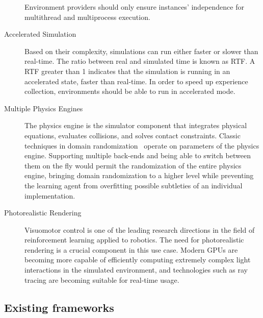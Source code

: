 \begin{description}
Environment providers should only ensure instances' independence for multithread and multiprocess execution.
%
\item[Accelerated Simulation]
%
Based on their complexity, simulations can run either faster or slower than real-time.
The ratio between real and simulated time is known as \ac{RTF}.
A \ac{RTF} greater than 1 indicates that the simulation is running in an accelerated state, \ie faster than real-time.
In order to speed up experience collection, environments should be able to run in accelerated mode.
%
\item[Multiple Physics Engines]
%
The physics engine is the simulator component that integrates physical equations, evaluates collisions, and solves contact constraints.
Classic techniques in domain randomization~\parencite{peng_sim--real_2018, ramos_bayessim_2019} operate on parameters of the physics engine.
Supporting multiple back-ends and being able to switch between them on the fly would permit the randomization of the entire physics engine, bringing domain randomization to a higher level while preventing
the learning agent from overfitting possible subtleties of an individual implementation.
%
\item[Photorealistic Rendering]
%
Visuomotor control is one of the leading research directions in the field of reinforcement learning applied to robotics.
The need for photorealistic rendering is a crucial component in this use case.
Modern \acp{GPU} are becoming more capable of efficiently computing extremely complex light interactions in the simulated environment, and technologies such as ray tracing are becoming suitable for real-time usage.
%
\end{description}

\subsection{Existing frameworks}

